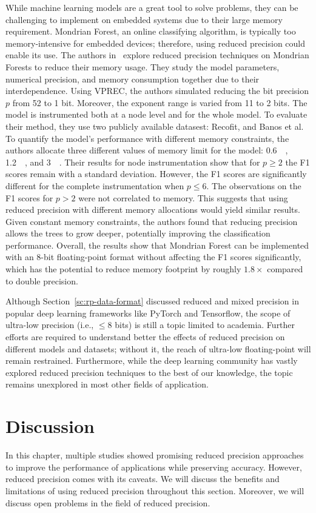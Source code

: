 While machine learning models are a great tool to solve problems, they can be challenging
to implement on embedded systems due to their large memory requirement.
Mondrian Forest, an online classifying algorithm, is typically too memory-intensive
for embedded devices; therefore, using reduced precision could enable its use.
The authors in~\cite{Vicuna2021-mw} explore reduced precision techniques on Mondrian Forests
to reduce their memory usage.
They study the model parameters, numerical precision, and memory consumption together
due to their interdependence.
Using VPREC, the authors simulated reducing the bit precision $p$ from 52 to 1 bit.
Moreover, the exponent range is varied from 11 to 2 bits.
The model is instrumented both at a node level and for the whole model.
To evaluate their method, they use two publicly available datasest: Recofit, and Banos et al.
To quantify the model's performance with different memory constraints, the authors allocate three
different values of memory limit for the model: \SI{0.6}{\mega\byte}, \SI{1.2}{\mega\byte}, and \SI{3}{\mega\byte}.
Their results for node instrumentation show that for $p \ge 2$ the F1 scores remain with a standard deviation.
However, the F1 scores are significantly different for the complete instrumentation when $p \le 6$.
The observations on the F1 scores for $p > 2$ were not correlated to memory.
This suggests that using reduced precision with different memory allocations would yield similar results.
Given constant memory constraints, the authors found that reducing precision allows the
trees to grow deeper, potentially improving the classification performance.
Overall, the results show that Mondrian Forest can be implemented with an 8-bit floating-point
format without affecting the F1 scores significantly, which has the potential to
reduce memory footprint by roughly $1.8\times$ compared to double precision.

Although Section~\ref{sc:rp-data-format} discussed reduced and mixed precision
in popular deep learning frameworks like PyTorch and Tensorflow, the scope of
ultra-low precision (i.e., $\le 8$ bits) is still a topic limited to academia.
Further efforts are required to understand better the effects of reduced precision 
on different models and datasets; without it, the reach of ultra-low floating-point will remain restrained.
Furthermore, while the deep learning community has vastly explored reduced precision
techniques to the best of our knowledge, the topic remains unexplored in most other fields of application.

\section{Discussion}
\label{sc:reduced_precision_discussion}
In this chapter, multiple studies showed promising reduced precision approaches
to improve the performance of applications while preserving accuracy.
However, reduced precision comes with its caveats.
We will discuss the benefits and limitations of using reduced precision throughout this section.
Moreover, we will discuss open problems in the field of reduced precision.


